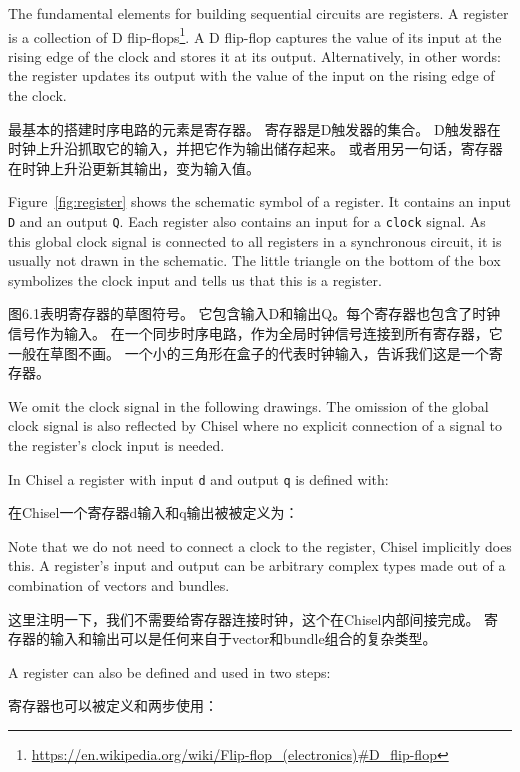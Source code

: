 \documentclass[%
    10pt,
    headinclude, footexclude,
    openright, %
    notitlepage,
    cleardoubleempty,
    headsepline,
    pointlessnumbers,
    bibtotoc, idxtotoc,
    ]{scrbook}
\newcommand{\code}[1]{{\small{\texttt{#1}}}}
\newcommand{\myref}[2]{\href{#1}{#2}}
\renewcommand{\myref}[2]{{#2}{\footnote{\url{#1}}}}
\begin{document}
The fundamental elements for building sequential circuits are registers. A register is a collection
of \myref{https://en.wikipedia.org/wiki/Flip-flop_(electronics)\#D_flip-flop}{D flip-flops}.
A D flip-flop captures the value of its input at the rising edge of the clock and stores
it at its output. Alternatively, in other words: the register updates its output with the value of the input on the rising edge of the clock.

最基本的搭建时序电路的元素是寄存器。
寄存器是D触发器的集合。
D触发器在时钟上升沿抓取它的输入，并把它作为输出储存起来。
或者用另一句话，寄存器在时钟上升沿更新其输出，变为输入值。

Figure~\ref{fig:register} shows the schematic symbol of a register. It contains an input
\code{D} and an output \code{Q}. Each register also contains an input for a \code{clock} signal.
As this global clock signal is connected to all registers in a synchronous circuit, it is usually
not drawn in the schematic. The little triangle on the bottom of the box symbolizes the
clock input and tells us that this is a register.

图6.1表明寄存器的草图符号。
它包含输入D和输出Q。每个寄存器也包含了时钟信号作为输入。
在一个同步时序电路，作为全局时钟信号连接到所有寄存器，它一般在草图不画。
一个小的三角形在盒子的代表时钟输入，告诉我们这是一个寄存器。

We omit the clock signal in the following
drawings. The omission of the global clock signal is also reflected by Chisel where no explicit
connection of a signal to the register's clock input is needed.




In Chisel a register with input \code{d} and output \code{q} is defined with:

在Chisel一个寄存器d输入和q输出被被定义为：


\noindent Note that we do not need to connect a clock to the register, Chisel implicitly does this.
A register's input and output can be arbitrary complex types
made out of a combination of vectors and bundles.

这里注明一下，我们不需要给寄存器连接时钟，这个在Chisel内部间接完成。 
寄存器的输入和输出可以是任何来自于vector和bundle组合的复杂类型。


A register can also be defined and used in two steps:

寄存器也可以被定义和两步使用：

\end{document}

